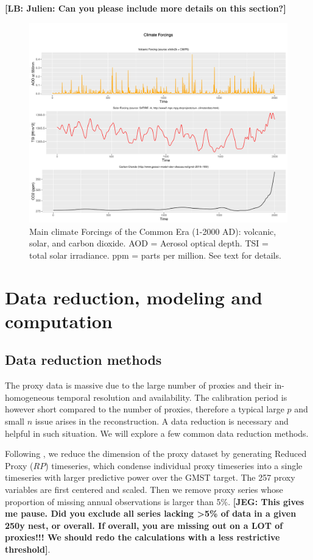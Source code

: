 \documentclass[11pt]{amsart}
\theoremstyle{plain}
\theoremstyle{definition}
\theoremstyle{remark}
\newcommand{\lb}[1]{\color{MidnightBlue}\textbf{[LB: #1]}\normalcolor}
\newcommand{\jeg}[1]{\color{ProcessBlue}\textbf{[JEG: #1]}\normalcolor}
\begin{document}
\lb{Julien: Can you please include more details on this section?}

\begin{figure}[H]
  \centering
  \includegraphics[scale=0.35]{forcings}
  \caption{Main climate Forcings of the Common Era (1-2000 AD): volcanic, solar, and carbon dioxide. AOD = Aerosol optical depth. TSI = total solar irradiance. ppm = parts per million. See text for details.}
  \label{fig:forcings}
\end{figure}


\section{Data reduction, modeling and computation}\label{sec:model}
\subsection{Data reduction methods}
\label{sec:rp}

The proxy data is massive due to the large number of proxies and their in-homogeneous temporal resolution and availability. The calibration period is however short compared to the number of proxies, therefore a typical large $p$ and small $n$ issue arises in the reconstruction. A data reduction is necessary and helpful in such situation. We will explore a few common data reduction methods.    

Following \cite{Barboza2014}, we reduce the dimension of the proxy dataset by generating Reduced Proxy ($RP$) timeseries, which condense individual proxy timeseries into a single timeseries with larger predictive power over the GMST target.  The 257 proxy variables are first centered and scaled. Then we remove proxy series whose proportion of missing annual observations is larger than 5\%.  \jeg{This gives me pause. Did you exclude all series lacking >5\% of data in a given 250y nest, or overall. If overall, you are missing out on a LOT of proxies!!! We should redo the calculations with a less restrictive threshold}. 
\end{document}
